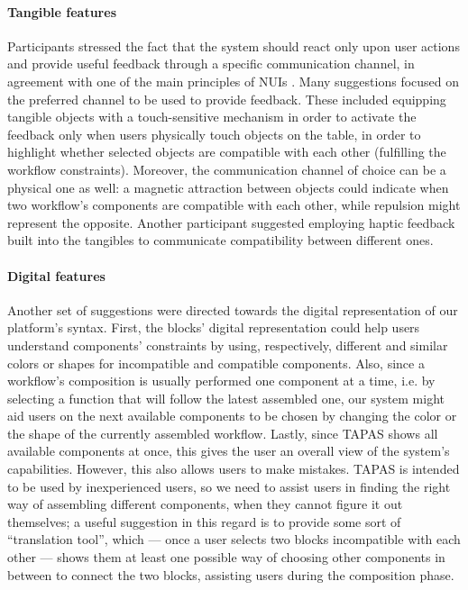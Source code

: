 \paragraph{Tangible features} Participants stressed the fact that the system should react only upon user actions and provide useful feedback through a specific communication channel, in agreement with one of the main principles of \acp{NUI} \cite{Wigdor:2011bi}. Many suggestions focused on the preferred channel to be used to provide feedback. These included equipping tangible objects with a touch-sensitive mechanism in order to activate the feedback only when users physically touch objects on the table, in order to highlight whether selected objects are compatible with each other (fulfilling the workflow constraints). Moreover, the communication channel of choice can be a physical one as well: a magnetic attraction between objects could indicate when two workflow's components are compatible with each other, while repulsion might represent the opposite. Another participant suggested employing haptic feedback built into the tangibles to communicate compatibility between different ones.

\paragraph{Digital features} Another set of suggestions were directed towards the digital representation of our platform's syntax. First, the blocks' digital representation could help users understand components' constraints by using, respectively, different and similar colors or shapes for incompatible and compatible components. Also, since a workflow's composition is usually performed one component at a time, i.e. by selecting a function that will follow the latest assembled one, our system might aid users on the next available components to be chosen by changing the color or the shape of the currently assembled workflow. Lastly, since \ac{TAPAS} shows all available components at once, this gives the user an overall view of the system's capabilities. However, this also allows users to make mistakes. \ac{TAPAS} is intended to be used by inexperienced users, so we need to assist users in finding the right way of assembling different components, when they cannot figure it out themselves; a useful suggestion in this regard is to provide some sort of ``translation tool'', which --- once a user selects two blocks incompatible with each other --- shows them at least one possible way of choosing other components in between to connect the two blocks, assisting users during the composition phase.

